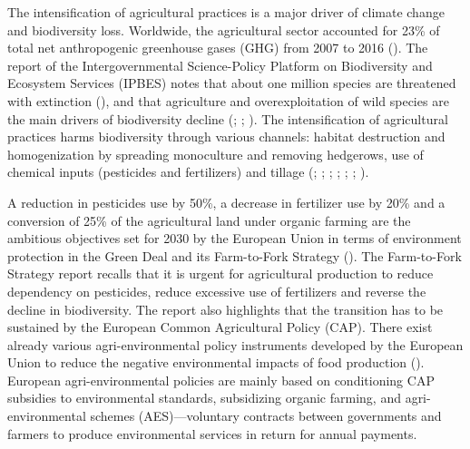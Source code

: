 \begin{Article}
\begin{refsection}[Lassalas]
The intensification of agricultural practices is a major driver of
climate change and biodiversity loss. Worldwide, the agricultural sector
accounted for 23\% of total net anthropogenic greenhouse gases (GHG)
from 2007 to 2016 (\textcite{ipcc_2019}). The report of the Intergovernmental
Science-Policy Platform on Biodiversity and Ecosystem Services (IPBES)
notes that about one million species are threatened with extinction
(\textcite{ipbes_2019}), and that agriculture and overexploitation of wild
species are the main drivers of biodiversity decline (\textcite{maxwell_fuller_brooks_w_2016}; \textcite{tilman_etal_2017}; \textcite{ipbes_2019}). The
intensification of agricultural practices harms biodiversity through
various channels: habitat destruction and homogenization by spreading
monoculture and removing hedgerows, use of chemical inputs (pesticides
and fertilizers) and tillage (\textcite{benton2003farmland}; \textcite{hautier_niklaus_hector_2009}; \textcite{geiger_et_al_2010}; \cite{beketov2013pesticides}; \textcite{arslan2018}; \textcite{sanchez-bayo_wyckhuys_2019}; \textcite{raven_wagner_2021}).

A reduction in pesticides use by 50\%, a decrease in fertilizer use by
20\% and a conversion of 25\% of the agricultural land under organic
farming are the ambitious objectives set for 2030 by the European Union
in terms of environment protection in the Green Deal and its
Farm-to-Fork Strategy (\textcite{european_commission_2020}). The Farm-to-Fork Strategy report recalls that it is urgent for agricultural production to
reduce dependency on pesticides, reduce excessive use of fertilizers and
reverse the decline in biodiversity. The report also highlights that the
transition has to be sustained by the European Common Agricultural
Policy (CAP). There exist already various agri-environmental policy
instruments developed by the European Union to reduce the negative
environmental impacts of food production (\textcite{deboe_2020}). European
agri-environmental policies are mainly based on conditioning CAP
subsidies to environmental standards, subsidizing organic farming, and
agri-environmental schemes (AES)---voluntary contracts between
governments and farmers to produce environmental services in return for
annual payments.


\end{refsection}
\end{Article}
